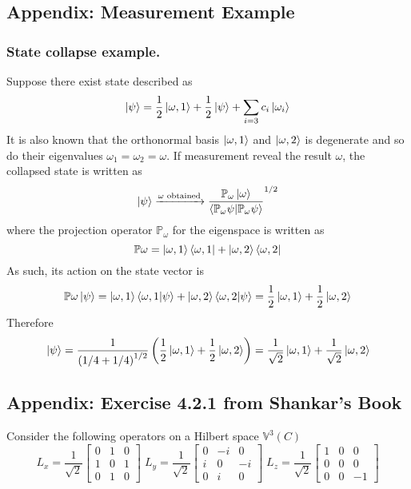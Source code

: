\documentclass[../../../main.tex]{subfiles}
\begin{document}
\subsection{Appendix: Measurement Example}
\subsubsection{State collapse example.}
Suppose there exist  state described as 
\begin{equation*}
    \ket{\psi}=\frac{1 }{2}\ket{\omega,1}+\frac{1 }{2}\ket{\psi}+\sum_{i=3} c_i \ket{\omega_i}
\end{equation*}
It is also known that the orthonormal basis $\ket{\omega,1  }$ and $\ket{\omega,2}$ is degenerate and so do their eigenvalues $\omega_1=\omega_2=\omega$.
If measurement reveal the result $\omega$, the collapsed state is written as 
\begin{equation*}
    \ket{\psi}\xrightarrow{\omega\text{ obtained}}\frac{\mathbb{P}_\omega \ket{\omega }}{\braket{\mathbb{P}_\omega\psi|\mathbb{P }_\omega \psi}}^{1/2}
\end{equation*}
where the projection operator $\mathbb{P }_\omega$ for the eigenspace is written as 
\begin{equation*}
    \mathbb{P }\omega=\ket{\omega,1}\bra{\omega,1}+\ket{\omega,2}\bra{\omega,2}
\end{equation*} 
As such, its action on the state vector is 
\begin{equation*}
    \mathbb{P }\omega \ket{\psi}=\ket{\omega,1}\braket{\omega,1|\psi}+\ket{\omega,2}\braket{\omega,2|\psi}
    =\frac{1 }{2 }\ket{\omega,1}+\frac{1 }{2 }\ket{\omega,2}
\end{equation*}
Therefore
\begin{equation*}
    \ket{\psi}=\frac{1}{\left( 1/4+1/4 \right) ^{1/2}}\left(\frac{1 }{2 }\ket{\omega,1}+\frac{1 }{2 }\ket{\omega,2}\right)
    =\frac{1 }{\sqrt{2} }\ket{\omega,1}+\frac{1 }{\sqrt{2} }\ket{\omega,2}
\end{equation*}

\subsection{Appendix: Exercise 4.2.1 from Shankar's Book}
Consider the following operators on a Hilbert space $\mathbb{V}^3(C)$
\begin{equation*}
    L_x=\frac{1 }{\sqrt{2 }}\begin{bmatrix}
        0&1&0\\
        1&0&1\\
        0&1&0
    \end{bmatrix}\;
    L_y=\frac{1 }{\sqrt{2 }}\begin{bmatrix}
        0&-i&0\\
        i&0&-i\\
        0&i&0
    \end{bmatrix}\;
    L_z=\frac{1 }{\sqrt{2 }}\begin{bmatrix}
        1&0&0\\
        0&0&0\\
        0&0&-1
    \end{bmatrix}
\end{equation*}
\end{document}
